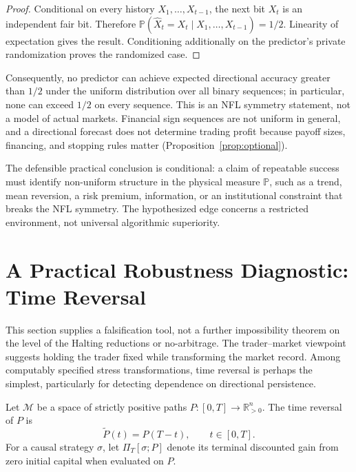 \documentclass[aps,pra,reprint,superscriptaddress,amsmath,amssymb,floatfix]{revtex4-2}
\theoremstyle{plain}
\theoremstyle{definition}
\theoremstyle{remark}
\begin{document}
\begin{proof}
Conditional on every history \(X_1,\ldots,X_{t-1}\), the next bit \(X_t\) is
an independent fair bit. Therefore
\(\mathbb{P}(\widehat X_t=X_t\mid X_1,\ldots,X_{t-1})=1/2\).
Linearity of expectation gives the result. Conditioning additionally on the
predictor's private randomization proves the randomized case.
\end{proof}

Consequently, no predictor can achieve expected directional accuracy greater
than \(1/2\) under the uniform distribution over all binary sequences; in
particular, none can exceed \(1/2\) on every sequence. This is an NFL symmetry
statement, not a model of actual markets. Financial sign sequences are not
uniform in general, and a directional forecast does not determine trading
profit because payoff sizes, financing, and stopping rules matter
(Proposition~\ref{prop:optional}).

The defensible practical conclusion is conditional: a claim of repeatable
success must identify non-uniform structure in the physical measure
\(\mathbb{P}\), such as a trend, mean reversion, a risk premium, information,
or an institutional constraint that breaks the NFL symmetry. The hypothesized
edge concerns a restricted environment, not universal algorithmic
superiority.

\section{A Practical Robustness Diagnostic: Time Reversal}
\label{sec:criterion}

This section supplies a falsification tool, not a further impossibility
theorem on the level of the Halting reductions or no-arbitrage. The
trader--market viewpoint suggests holding the trader fixed while transforming
the market record. Among computably specified stress transformations, time
reversal is perhaps the simplest, particularly for detecting dependence on
directional persistence.

Let \(\mathcal{M}\) be a space of strictly positive paths
\(P\colon[0,T]\to\mathbb{R}_{>0}^n\). The time reversal of \(P\) is
\begin{equation}
  \widetilde{P}(t)=P(T-t), \qquad t\in[0,T].
  \label{eq:timereversal}
\end{equation}
For a causal strategy \(\sigma\), let \(\Pi_T[\sigma;P]\) denote its terminal
discounted gain from zero initial capital when evaluated on \(P\).
\end{document}
